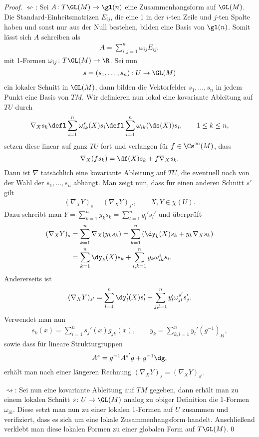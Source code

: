 \documentclass[%
	paper=a5,%
	fleqn,%
	DIV=18,%
	BCOR=0mm,
	fontsize=11pt,
	titlepage=false,%
	bibliography=totoc,
	DIV=18,%
	twoside=true,
	pdftitle=Riemannsche Geometrie,
	pdfauthor=Uwe Semmelmann,
	numbers=noendperiod]%
	{scrbook}
\begin{document}
\begin{proof}

$\leftsquigarrow$: Sei $A\colon T\GL(M) \to \gl(n)$ eine Zusammenhangsform auf
$\GL(M)$. Die Standard-Einheitsmatrizen $E_{ij}$, die eine 1 in der $i$-ten
Zeile und $j$-ten Spalte haben und sonst nur aus der Null bestehen, bilden eine
Basis von $\gl(n)$. Somit lässt sich $A$ schreiben als
\begin{align*}
A = \sum_{i,j=1}^n \omega_{ij} E_{ij},
\end{align*}
mit 1-Formen $\omega_{ij}\colon T\GL(M)\to \R$. Sei nun 
\begin{align*}
s=(s_1,\ldots,s_n): U\to \GL(M)
\end{align*}
ein lokaler Schnitt in $\GL(M)$, dann bilden die Vektorfelder $s_1,\ldots,s_n$
in jedem Punkt eine Basis von $TM$. Wir definieren nun lokal eine kovariante
Ableitung auf $TU$ durch
\begin{align*}
\nabla_X s_k \defl \sum_{i=1}^n \omega_{ik}^s(X)s_i
\defl \sum_{i=1}^n \omega_{ik}(\ds(X))s_i,\qquad 1\le k\le n,
\end{align*}
setzen diese linear auf ganz $TU$ fort und verlangen für $f\in\Cs^\infty(M)$,
dass
\begin{align*}
\nabla_X (f s_k) = \df(X) s_k + f\nabla_X s_k.
\end{align*}
Dann ist $\nabla$ tatsächlich eine kovariante Ableitung auf $TU$, die eventuell
noch von der Wahl der $s_1,\ldots,s_n$ abhängt. Man zeigt nun, dass für einen
anderen Schnitt $s'$ gilt
\begin{align*}
(\nabla_X Y)_s = (\nabla_X Y)_{s'},\qquad X,Y\in\chi(U).
\end{align*}
Dazu schreibt man $Y = \sum_{k=1}^n y_k s_k = \sum_{l=1}^n y_l' s_l'$ und
überprüft
\begin{align*}
(\nabla_X Y)_s &= 
\sum_{k=1}^n \nabla_X (y_k s_k)
= \sum_{k=1}^n \left(\dy_k(X) s_k + y_k \nabla_X s_k\right)\\
&= \sum_{k=1}^n \dy_k(X) s_k   + \sum_{i,k=1}^n y_k \omega_{ik}^s s_i.
\end{align*}
Andererseits ist
\begin{align*}
(\nabla_X Y)_{s'} = 
\sum_{l=1}^n \dy_l'(X) s_l'   + \sum_{j,l=1}^n y_l' \omega_{jl}^{s'} s_j'.
\end{align*}
Verwendet man nun
\begin{align*}
s_k(x) = \sum_{i=1}^n s_j'(x)g_{jk}(x),\qquad y_k =
\sum_{k,l=1}^ny_l'(g^{-1})_{kl},
\end{align*}
sowie dass für lineare Strukturgruppen
\begin{align*}
A^s = g^{-1}A^{s'}g + g^{-1}\dg,
\end{align*}
erhält man nach einer längeren Rechnung $(\nabla_X Y)_s = (\nabla_X Y)_{s'}$.

$\rightsquigarrow$: Sei nun eine kovariante Ableitung auf $TM$ gegeben, dann
erhält man zu einem lokalen Schnitt $s\colon U \to \GL(M)$ analog zu obiger
Definition die 1-Formen $\omega_{ik}$. Diese setzt man nun zu einer lokalen
1-Formen auf $U$ zusammen und verifiziert, dass es sich um eine
lokale Zusammenhangsform handelt. Anschließend verklebt man diese lokalen Formen
zu einer globalen Form auf $T\GL(M)$.\qed
\end{proof}
\end{document}

